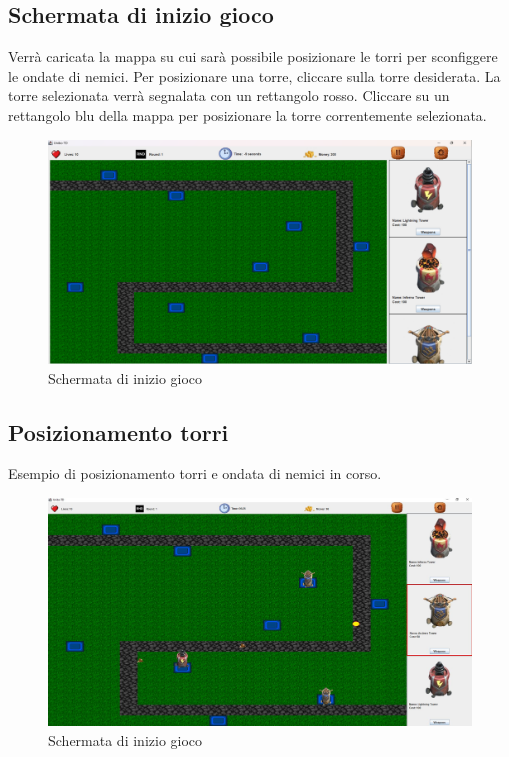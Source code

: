 \documentclass[a4paper,12pt]{report}
\begin{document}
\vspace{70mm}

\subsection{Schermata di inizio gioco}
Verrà caricata la mappa su cui sarà possibile posizionare le torri per sconfiggere le ondate di nemici. Per posizionare una torre, cliccare sulla torre desiderata. 
La torre selezionata verrà segnalata con un rettangolo rosso.
Cliccare su un rettangolo blu della mappa per posizionare la torre correntemente selezionata.

\begin{figure}[H]
    \centering
    \includegraphics[width=\linewidth]{PosizionamentoTorri}
    \caption{Schermata di inizio gioco}
    \label{fig:gamePlay}
\end{figure}

\vspace{70mm}

\subsection{Posizionamento torri}
Esempio di posizionamento torri e ondata di nemici in corso.
\begin{figure}[H]
    \centering
    \includegraphics[width=\linewidth]{tower_pos}
    \caption{Schermata di inizio gioco}
    \label{fig:tower_pos}
\end{figure}
\end{document}
